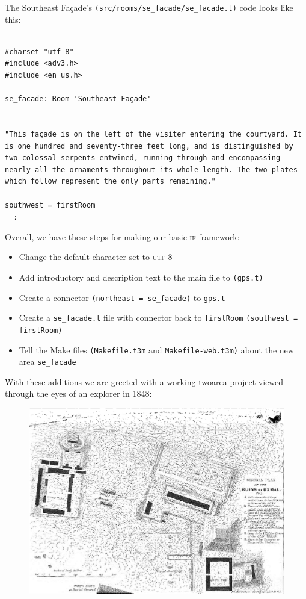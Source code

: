 The Southeast Façade's \texttt{\scriptsize{(src/rooms/se\_facade/se\_facade.t)}} code looks like this:

\begin{lstlisting}
  
#charset "utf-8"
#include <adv3.h>
#include <en_us.h>

se_facade: Room 'Southeast Façade'


"This façade is on the left of the visiter entering the courtyard. It is one hundred and seventy-three feet long, and is distinguished by two colossal serpents entwined, running through and encompassing nearly all the ornaments throughout its whole length. The two plates which follow represent the only parts remaining."

southwest = firstRoom
  ;
\end{lstlisting}
Overall, we have these steps for making our basic \textsc{if} framework:
\begin{itemize}[leftmargin=0em]
  \item{Change the default character set to \textsc{utf-8}}
  \item{Add introductory and description text to the main file to \texttt{\scriptsize{(gps.t)}}}
  \item{Create a connector \texttt{\scriptsize{(northeast = se\_facade)}} to \texttt{\scriptsize{gps.t}}}
  \item{Create a \texttt{\scriptsize{se\_facade.t}} file with connector back to
      \texttt{\scriptsize{firstRoom}} \texttt{\scriptsize{(southwest = firstRoom)}}}
  \item{Tell the Make files \texttt{\scriptsize{(Makefile.t3m}} and
        \texttt{\scriptsize{Makefile-web.t3m)}} about the new area {\texttt{se\_facade}}}
  \end{itemize}
With these additions we are greeted with a working two\textendash area project viewed through the eyes of an explorer in 1848:
\begin{figure}[ht]                                                           
  \begin{center}
 \includegraphics[width=\linewidth]{./media/images/if_cover}%
  \label{fig:if_cover}%
  \end{center}
\end{figure}

